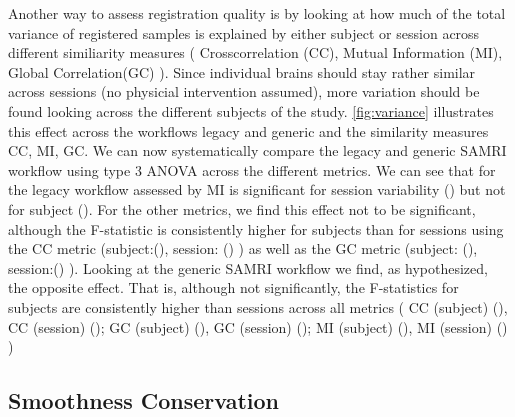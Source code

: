Another way to assess registration quality is by looking at how much of the total variance of registered samples is explained by either subject or session across different similiarity measures ( Crosscorrelation (CC), Mutual Information (MI), Global Correlation(GC) ). 
Since individual brains should stay rather similar across sessions (no physicial intervention assumed), more variation should be found looking across the different subjects of the study. 
\cref{fig:variance} illustrates this effect across the workflows legacy and generic and the similarity measures CC, MI, GC. 
We can now systematically compare the legacy and generic SAMRI workflow using type 3 ANOVA across the different metrics. 
We can see that for the legacy workflow assessed by MI is significant for session variability () but not for subject (). 
For the other metrics, we find this effect not to be significant, although the F-statistic is consistently higher for subjects than for sessions using the CC metric (subject:(), session: () ) as well as the GC metric (subject: (), session:() ). 
Looking at the generic SAMRI workflow we find, as hypothesized, the opposite effect. That is, although not significantly, the F-statistics for subjects are consistently higher than sessions across all metrics ( CC (subject) (), CC (session) (); GC (subject) (), GC (session) (); MI (subject) (), MI (session) () )

\subsection{Smoothness Conservation}

